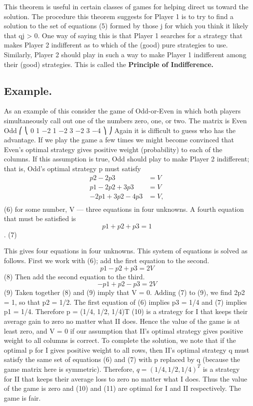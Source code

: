 \documentclass[]{report}
\begin{document}
This theorem is useful in certain classes of games for helping direct us toward the
solution. The procedure this theorem suggests for Player 1 is to try to find a solution to
the set of equations (5) formed by those j for which you think it likely that qj > 0. One
way of saying this is that Player 1 searches for a strategy that makes Player 2 indifferent
as to which of the (good) pure strategies to use. Similarly, Player 2 should play in such a
way to make Player 1 indifferent among their (good) strategies. This is called the \textbf{Principle
of Indifference.}

\subsection{Example.} As an example of this consider the game of Odd-or-Even in which both
players simultaneously call out one of the numbers zero, one, or two. The matrix is
Even
Odd
⎛
⎝
0 1 −2
1 −2 3
−2 3 −4
⎞
⎠
Again it is difficult to guess who has the advantage. If we play the game a few times we
might become convinced that Even’s optimal strategy gives positive weight (probability)
to each of the columns. If this assumption is true, Odd should play to make Player 2
indifferent; that is, Odd’s optimal strategy p must satisfy
\begin{eqnarray}
p2 − 2p3 &= V\\
p1 − 2p2 + 3p3 &= V\\
−2p1 + 3p2 − 4p3 &= V,\\
\end{eqnarray}
(6)
for some number, V — three equations in four unknowns. A fourth equation that must be
satisfied is
\[p1 + p2 + p3 = 1\]. (7)

This gives four equations in four unknowns. This system of equations is solved as follows.
First we work with (6); add the first equation to the second.
\[p1 − p2 + p3 = 2V\] (8)
Then add the second equation to the third.
\[−p1 + p2 − p3 = 2V\] (9)
Taken together (8) and (9) imply that V = 0. Adding (7) to (9), we find 2p2 = 1, so that
p2 = 1/2. The first equation of (6) implies p3 = 1/4 and (7) implies p1 = 1/4. Therefore
p = (1/4, 1/2, 1/4)T (10)
is a strategy for I that keeps their average gain to zero no matter what II does. Hence the
value of the game is at least zero, and V = 0 if our assumption that II’s optimal strategy
gives positive weight to all columns is correct. To complete the solution, we note that if the
optimal p for I gives positive weight to all rows, then II’s optimal strategy q must satisfy
the same set of equations (6) and (7) with p replaced by q (because the game matrix here
is symmetric). Therefore,
$q = (1/4, 1/2, 1/4)^T$ 
is a strategy for II that keeps their average loss to zero no matter what I does. Thus the
value of the game is zero and (10) and (11) are optimal for I and II respectively. The game
is fair.
\end{document}
